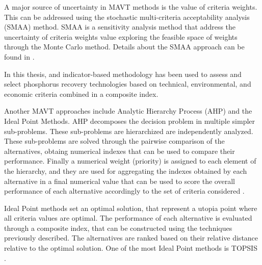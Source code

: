 \begin{refsection}[referencesCh1]
A major source of uncertainty in MAVT methods is the value of criteria weights. This can be addressed using the stochastic multi-criteria acceptability analysis (SMAA) method. SMAA is a sensitivity analysis method that address the uncertainty of criteria weights value exploring the feasible space of weights through the Monte Carlo method. Details about the SMAA approach can be found in \citet{tervonen_implementing_2007}.

In this thesis, and indicator-based methodology has been used to assess and select phosphorus recovery technologies based on technical, environmental, and economic criteria combined in a composite index.

Another MAVT approaches include Analytic Hierarchy Process (AHP) and the Ideal Point Methods. AHP decomposes the decision problem in multiple simpler sub-problems. These sub-problems are hierarchized are independently analyzed. These sub-problems are solved through the pairwise comparison of the alternatives, obtaing numerical indexes that can be used to compare their performance. Finally a numerical weight (priority) is assigned to each element of the hierarchy, and they are used for aggregating the indexes obtained by each alternative in a final numerical value that can be used to score the overall performance of each alternative accordingly to the set of criteria considered \citep{saaty2000fundamentals}. 

Ideal Point methods set an optimal solution, that represent a utopia point where all criteria values are optimal. The performance of each alternative is evaluated through a composite index, that can be constructed using the techniques previously described. The alternatives are ranked based on their relative distance relative to the optimal solution. One of the most Ideal Point methods is TOPSIS \citep{hwang1995multi}.




\end{refsection}

